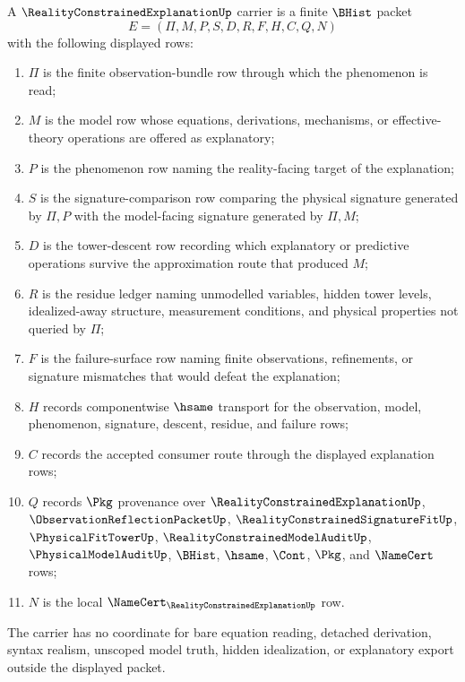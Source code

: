 \begin{definition}
\label{def:reality-constrained-explanation-carrier}
A $\RealityConstrainedExplanationUp$ carrier is a finite $\BHist$ packet
$$
E=(\Pi,M,P,S,D,R,F,H,C,Q,N)
$$
with the following displayed rows:
\begin{enumerate}
\item $\Pi$ is the finite observation-bundle row through which the phenomenon is read;
\item $M$ is the model row whose equations, derivations, mechanisms, or effective-theory operations are offered as explanatory;
\item $P$ is the phenomenon row naming the reality-facing target of the explanation;
\item $S$ is the signature-comparison row comparing the physical signature generated by $\Pi,P$ with the model-facing signature generated by $\Pi,M$;
\item $D$ is the tower-descent row recording which explanatory or predictive operations survive the approximation route that produced $M$;
\item $R$ is the residue ledger naming unmodelled variables, hidden tower levels, idealized-away structure, measurement conditions, and physical properties not queried by $\Pi$;
\item $F$ is the failure-surface row naming finite observations, refinements, or signature mismatches that would defeat the explanation;
\item $H$ records componentwise $\hsame$ transport for the observation, model, phenomenon, signature, descent, residue, and failure rows;
\item $C$ records the accepted consumer route through the displayed explanation rows;
\item $Q$ records $\Pkg$ provenance over $\RealityConstrainedExplanationUp$, $\ObservationReflectionPacketUp$, $\RealityConstrainedSignatureFitUp$, $\PhysicalFitTowerUp$, $\RealityConstrainedModelAuditUp$, $\PhysicalModelAuditUp$, $\BHist$, $\hsame$, $\Cont$, $\Pkg$, and $\NameCert$ rows;
\item $N$ is the local $\NameCert_{\RealityConstrainedExplanationUp}$ row.
\end{enumerate}
The carrier has no coordinate for bare equation reading, detached derivation, syntax realism, unscoped model truth, hidden idealization, or explanatory export outside the displayed packet.
\end{definition}

